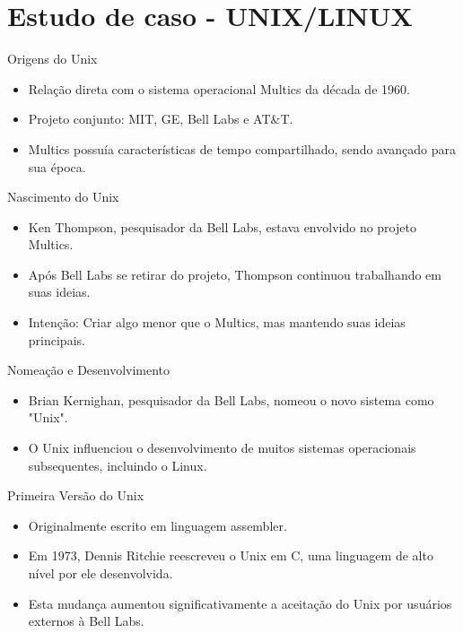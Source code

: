 \documentclass{beamer}
\begin{document}
\section{Estudo de caso - UNIX/LINUX}
\begin{frame}{Origens do Unix}
    \begin{itemize}
        \item Relação direta com o sistema operacional Multics da década de 1960.
        \item Projeto conjunto: MIT, GE, Bell Labs e AT\&T.
        \item Multics possuía características de tempo compartilhado, sendo avançado para sua época.
    \end{itemize}
\end{frame}

\begin{frame}{Nascimento do Unix}
    \begin{itemize}
        \item Ken Thompson, pesquisador da Bell Labs, estava envolvido no projeto Multics.
        \item Após Bell Labs se retirar do projeto, Thompson continuou trabalhando em suas ideias.
        \item Intenção: Criar algo menor que o Multics, mas mantendo suas ideias principais.
    \end{itemize}
\end{frame}

\begin{frame}{Nomeação e Desenvolvimento}
    \begin{itemize}
        \item Brian Kernighan, pesquisador da Bell Labs, nomeou o novo sistema como "Unix".
        \item O Unix influenciou o desenvolvimento de muitos sistemas operacionais subsequentes, incluindo o Linux.
    \end{itemize}
\end{frame}
\begin{frame}{Primeira Versão do Unix}
    \begin{itemize}
        \item Originalmente escrito em linguagem assembler.
        \item Em 1973, Dennis Ritchie reescreveu o Unix em C, uma linguagem de alto nível por ele desenvolvida.
        \item Esta mudança aumentou significativamente a aceitação do Unix por usuários externos à Bell Labs.
    \end{itemize}
\end{frame}
\end{document}

